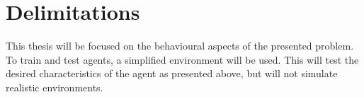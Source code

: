 \section{Delimitations}
\label{sec:delimitations}

This thesis will be focused on the behavioural aspects of the presented problem. To train and test agents, a simplified environment will be used. This will test the desired characteristics of the agent as presented above, but will not simulate realistic environments.